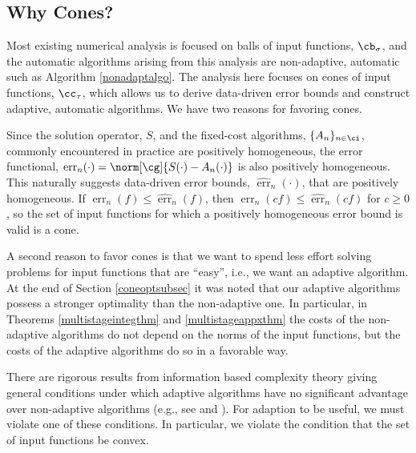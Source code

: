 \documentclass[]{elsarticle}
\DeclareMathOperator{\err}{err}
\newcommand{\herr}{\widehat{\err}}
\theoremstyle{definition}
\theoremstyle{remark}
\newcommand{\Gnorm}[1]{\norm[\cg]{#1}}
\begin{document}
\subsection{Why Cones?}

Most existing numerical analysis is focused on balls of input functions, $\cb_{\sigma}$, and the automatic algorithms arising from this analysis are non-adaptive, automatic such as Algorithm \ref{nonadaptalgo}. The analysis here focuses on cones of input functions, $\cc_{\tau}$, which allows us to derive data-driven error bounds and construct adaptive, automatic algorithms. We have two reasons for favoring cones.  

Since the solution operator, $S$, and the fixed-cost algorithms, $\{A_n\}_{n\in \ci}$, commonly encountered in practice are positively homogeneous, the error functional, $\err_n(\cdot) = \Gnorm{S(\cdot)-A_n(\cdot)}$ is also positively homogeneous.  This naturally suggests data-driven error bounds, $\herr_n(\cdot)$, that are positively homogeneous.  If $\err_n(f) \le \herr_n(f)$, then $\err_n(cf) \le \herr_n(cf)$ for $c\ge 0$, so the set of input functions for which a positively homogeneous error bound is valid is a cone.

A second reason to favor cones is that we want to spend less effort solving problems for input functions that are ``easy'', i.e., we want an adaptive algorithm.  At the end of Section \ref{coneoptsubsec} it was noted that our adaptive algorithms possess a stronger optimality than the non-adaptive one.  In particular, in Theorems \ref{multistageintegthm} and \ref{multistageappxthm} the costs of the non-adaptive algorithms do not depend on the norms of the input functions, but the costs of the adaptive algorithms do so in a favorable way.

There are rigorous results from information based complexity theory giving general conditions under which adaptive algorithms have no significant advantage over non-adaptive algorithms (e.g., see \cite[Chapter 4, Theorem 5.2.1]{TraWasWoz88} and \cite{Nov96a}). For adaption to be useful, we must violate one of these conditions.  In particular, we violate the condition that the set of input functions be convex.
\end{document}
